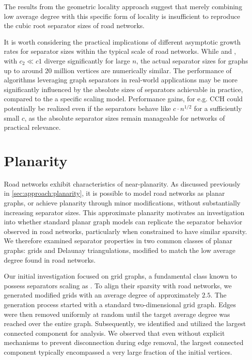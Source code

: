 The results from the geometric locality approach suggest that merely combining low average degree with this specific form of locality is insufficient to reproduce the cubic root separator sizes of road networks.

It is worth considering the practical implications of different asymptotic growth rates for separator sizes within the typical scale of road networks.
While  and , with \(c_2 \ll c1\) diverge significantly for large \(n\), the actual separator sizes for graphs up to around 20 million vertices are numerically similar.
The performance of algorithms leveraging graph separators in real-world applications may be more significantly influenced by the absolute sizes of separators achievable in practice, compared to the a specific scaling model.
Performance gains, for e.g. CCH could potentially be realized even if the separators behave like \(c \cdot n^{1/2}\) for a sufficiently small \(c\), as the absolute separator sizes remain manageable for networks of practical relevance.


\section{Planarity}
\label{sec:synthetic:planarity}

Road networks exhibit characteristics of near-planarity.
As discussed previously in \cref{sec:approach:planarity}, it is possible to model road networks as planar graphs, or achieve planarity through minor modifications, without substantially increasing separator sizes.
This approximate planarity motivates an investigation into whether standard planar graph models can replicate the separator behavior observed in road networks, particularly when constrained to have similar sparsity.
We therefore examined separator properties in two common classes of planar graphs: grids and Delaunay triangulations, modified to match the low average degree found in road networks.

Our initial investigation focused on grid graphs, a fundamental class known to possess separators scaling as .
To align their sparsity with road networks, we generated modified grids with an average degree of approximately \(2.5\).
The generation process started with a standard two-dimensional grid graph.
Edges were then removed uniformly at random until the target average degree was reached over the entire graph.
Subsequently, we identified and utilized the largest connected component for analysis.
We observed that even without explicit mechanisms to prevent disconnection during edge removal, the largest connected component typically encompassed a very large fraction of the initial vertices.

